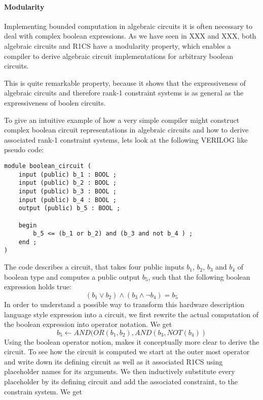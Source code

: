 \paragraph{Modularity} Implementing bounded computation in algebraic circuits it is often necessary to deal with complex boolean expressions. As we have seen in XXX and XXX, both algebraic circuits and R1CS have a modularity property, which enables a compiler to derive algebraic circuit implementations for arbitrary boolean circuits. 

This is quite remarkable property, because it shows that the expressiveness of algebraic circuits and therefore rank-1 constraint systems is as general as the expressiveness of boolen circuits.  
\begin{example} To give an intuitive example of how a very simple compiler might construct complex boolean circuit representations in algebraic circuits and how to derive associated rank-1 constraint systems, lets look at the following VERILOG like pseudo code:
\begin{lstlisting}
module boolean_circuit (
	input (public) b_1 : BOOL ; 
	input (public) b_2 : BOOL ;
	input (public) b_3 : BOOL ; 
	input (public) b_4 : BOOL ; 
	output (public) b_5 : BOOL ; 

	begin
		b_5 <= (b_1 or b_2) and (b_3 and not b_4 ) ;
	end ;
)
\end{lstlisting}
The code describes a circuit, that takes four public inputs $b_1$, $b_2$, $b_3$ and $b_4$ of boolean type and computes a public output $b_5$, such that the following boolean expression holds true:
$$
\left( b_1 \vee b_2 \right) \wedge (b_3 \wedge \lnot b_4) = b_5
$$
In order to understand a possible way to transform this hardware description language style expression into a circuit, we first rewrite the actual computation of the boolean expression into operator notation. We get
$$
b_5 \leftarrow AND(OR(b_1,b_2),AND(b_3,NOT(b_4))
$$
Using the boolean operator notion, makes it conceptually more clear to derive the circuit. To see how the circuit is computed we start at the outer most operator and  write down its defining circuit as well as it associated R1CS using placeholder names for its arguments. We then inductively substitute every placeholder by its defining circuit and add the associated constraint, to the constrain system. We get
\begin{center}
\end{center}
\end{example}

